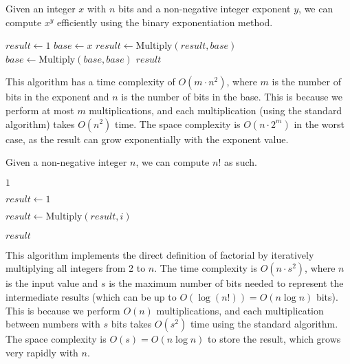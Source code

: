   \begin{algo}
    Given an integer $x$ with $n$ bits and a non-negative integer exponent $y$, we can compute $x^y$ efficiently using the binary exponentiation method.
    \begin{algorithmic}[1]  
       
        \State $result \gets 1$ 
        \State $base \gets x$ 
         
           
            \State $result \gets \text{Multiply}(result, base)$ 
          \EndIf
          \State $base \gets \text{Multiply}(base, base)$ 
        \EndFor
      \State \Return $result$ 
      \EndProcedure
    \end{algorithmic} 
    This algorithm has a time complexity of $O(m \cdot n^2)$, where $m$ is the number of bits in the exponent and $n$ is the number of bits in the base. This is because we perform at most $m$ multiplications, and each multiplication (using the standard algorithm) takes $O(n^2)$ time. The space complexity is $O(n \cdot 2^m)$ in the worst case, as the result can grow exponentially with the exponent value.
  \end{algo}

  \begin{algo}[Factorial]
    Given a non-negative integer $n$, we can compute $n!$ as such. 
    \begin{algorithmic}[1]
       
         
          \State \Return $1$ 
        \EndIf
        
        \State $result \gets 1$ 
        
         
          \State $result \gets \text{Multiply}(result, i)$ 
        \EndFor
        
        \State \Return $result$ 
      \EndProcedure
    \end{algorithmic}
    This algorithm implements the direct definition of factorial by iteratively multiplying all integers from 2 to $n$. The time complexity is $O(n \cdot s^2)$, where $n$ is the input value and $s$ is the maximum number of bits needed to represent the intermediate results (which can be up to $O(\log(n!)) = O(n \log n)$ bits). This is because we perform $O(n)$ multiplications, and each multiplication between numbers with $s$ bits takes $O(s^2)$ time using the standard algorithm. The space complexity is $O(s) = O(n \log n)$ to store the result, which grows very rapidly with $n$.
  \end{algo}

